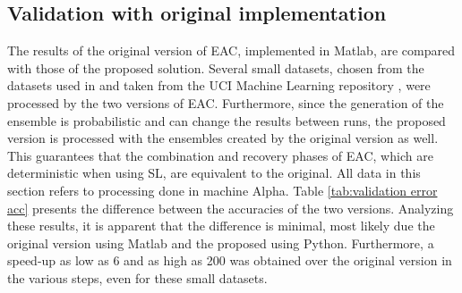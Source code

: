 \subsection{Validation with original implementation}

The results of the original version of EAC, implemented in Matlab, are compared with those of the proposed solution.
Several small datasets, chosen from the datasets used in \cite{Lourenco2010} and taken from the UCI Machine Learning repository \cite{Lichman:2013}, were processed by the two versions of EAC.
Furthermore, since the generation of the ensemble is probabilistic and can change the results between runs, the proposed version is processed with the ensembles created by the original version as well.
This guarantees that the combination and recovery phases of EAC, which are deterministic when using SL, are equivalent to the original.
All data in this section refers to processing done in machine Alpha.
Table \ref{tab:validation error acc} presents the difference between the accuracies of the two versions.
Analyzing these results, it is apparent that the difference is minimal, most likely due the original version using Matlab and the proposed using Python.
Furthermore, a speed-up as low as 6 and as high as 200 was obtained over the original version in the various steps, even for these small datasets.


